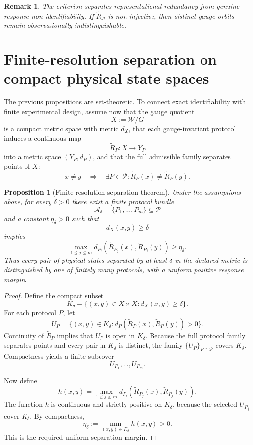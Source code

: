 \documentclass[11pt]{article}
\newtheorem{proposition}[definition]{Proposition}
\newtheorem{remark}[definition]{Remark}
\newcommand{\W}{\mathcal W}
\newcommand{\Pcal}{\mathcal P}
\newcommand{\Acal}{\mathcal A}
\begin{document}
\begin{remark}
The criterion separates representational redundancy from genuine response
non-identifiability.  If $\widetilde R_{\Acal}$ is non-injective, then distinct
gauge orbits remain observationally indistinguishable.
\end{remark}


\section{Finite-resolution separation on compact physical state spaces}

The previous propositions are set-theoretic.  To connect exact identifiability
with finite experimental design, assume now that the gauge quotient
\[
X:=\W/G
\]
is a compact metric space with metric $d_X$, that each gauge-invariant protocol
induces a continuous map
\[
\widetilde R_P:X\to Y_P
\]
into a metric space $(Y_P,d_P)$, and that the full admissible family separates
points of $X$:
\[
x\neq y
\quad\Longrightarrow\quad
\exists P\in\Pcal:
\widetilde R_P(x)\neq\widetilde R_P(y).
\]

\begin{proposition}[Finite-resolution separation theorem]
Under the assumptions above, for every $\delta>0$ there exist a finite protocol
bundle
\[
\Acal_\delta=\{P_1,\dots,P_m\}\subseteq\Pcal
\]
and a constant $\eta_\delta>0$ such that
\[
d_X(x,y)\ge\delta
\]
implies
\[
\max_{1\le j\le m}
d_{P_j}\!\left(
\widetilde R_{P_j}(x),
\widetilde R_{P_j}(y)
\right)
\ge\eta_\delta.
\]
Thus every pair of physical states separated by at least $\delta$ in the
declared metric is distinguished by one of finitely many protocols, with a
uniform positive response margin.
\end{proposition}

\begin{proof}
Define the compact subset
\[
K_\delta
=
\{(x,y)\in X\times X:d_X(x,y)\ge\delta\}.
\]
For each protocol $P$, let
\[
U_P
=
\{(x,y)\in K_\delta:
d_P(\widetilde R_P(x),\widetilde R_P(y))>0\}.
\]
Continuity of $\widetilde R_P$ implies that $U_P$ is open in $K_\delta$.
Because the full protocol family separates points and every pair in
$K_\delta$ is distinct, the family $\{U_P\}_{P\in\Pcal}$ covers $K_\delta$.
Compactness yields a finite subcover
\[
U_{P_1},\dots,U_{P_m}.
\]

Now define
\[
h(x,y)
=
\max_{1\le j\le m}
d_{P_j}(\widetilde R_{P_j}(x),\widetilde R_{P_j}(y)).
\]
The function $h$ is continuous and strictly positive on $K_\delta$, because
the selected $U_{P_j}$ cover $K_\delta$.  By compactness,
\[
\eta_\delta
:=
\min_{(x,y)\in K_\delta}h(x,y)
>0.
\]
This is the required uniform separation margin.
\end{proof}
\end{document}
